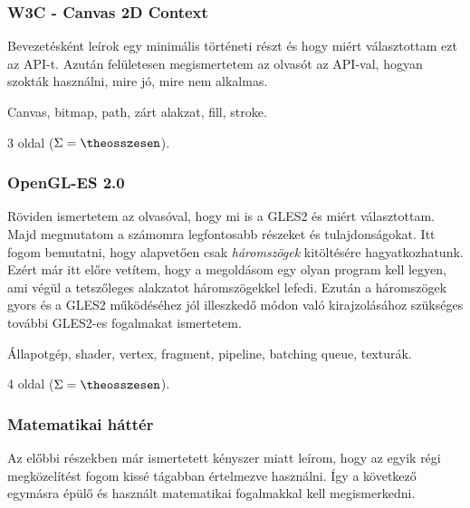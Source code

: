 \documentclass[12pt]{article}
\newcounter{osszesen}
\newcommand*{\oldalak}[1]{#1 oldal \setcounter{osszesen}{\theosszesen +
#1}($\Sigma=\theosszesen$)}
\begin{document}
\subsubsection{W3C - Canvas 2D Context}

Bevezetésként leírok egy minimális történeti részt és hogy miért választottam
ezt az API-t. Azután felületesen megismertetem az olvasót az API-val, hogyan
szokták használni, mire jó, mire nem alkalmas.

\begin{description}[noitemsep]
  \item[Kulcsszavak] Canvas, bitmap, path, zárt alakzat, fill, stroke.
  \item[Becsült oldalszám] \oldalak{3}.
\end{description}

\subsubsection{OpenGL-ES 2.0}

Röviden ismertetem az olvasóval, hogy mi is a GLES2 és miért választottam.
Majd megmutatom a számomra legfontosabb részeket és tulajdonságokat. Itt
fogom bemutatni, hogy alapvetően csak \emph{háromszögek} kitöltésére
hagyatkozhatunk. Ezért már itt előre vetítem, hogy a megoldásom egy olyan
program kell legyen, ami végül a tetszőleges alakzatot háromszögekkel lefedi.
Ezután a háromszögek gyors és a GLES2 működéséhez jól illeszkedő
módon való kirajzolásához szükséges további GLES2-es fogalmakat ismertetem.

\begin{description}[noitemsep]
  \item[Kulcsszavak] Állapotgép, shader, vertex, fragment, pipeline, batching
  queue, texturák.
  \item[Becsült oldalszám] \oldalak{4}.
\end{description}

\subsubsection{Matematikai háttér}

Az előbbi részekben már ismertetett kényszer miatt leírom, hogy az egyik
régi megközelítést fogom kissé tágabban értelmezve használni. Így a
következő egymásra épülő és használt matematikai fogalmakkal kell
megismerkedni.
\end{document}
